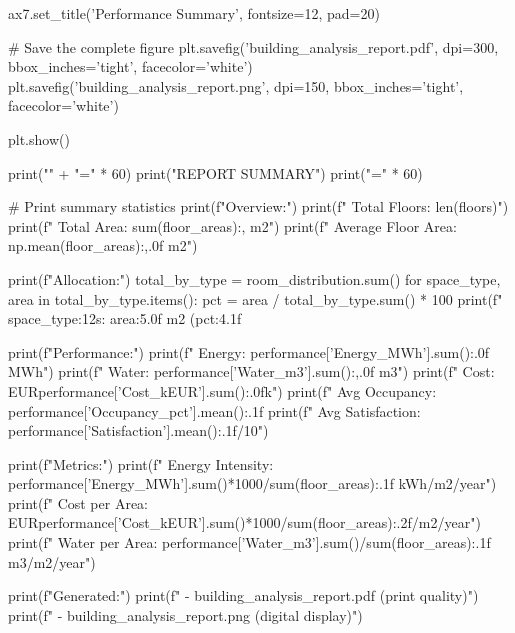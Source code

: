 {{    ax7.set_title('Performance Summary', fontsize=12, pad=20)
    
    # Save the complete figure
    plt.savefig('building_analysis_report.pdf', 
               dpi=300, bbox_inches='tight', facecolor='white')
    plt.savefig('building_analysis_report.png', 
               dpi=150, bbox_inches='tight', facecolor='white')
    
    plt.show()
    
    print("\n" + "=" * 60)
    print("REPORT SUMMARY")
    print("=" * 60)
    
    # Print summary statistics
    print(f"\nBuilding Overview:")
    print(f"  Total Floors: {len(floors)}")
    print(f"  Total Area: {sum(floor_areas):,} m2")
    print(f"  Average Floor Area: {np.mean(floor_areas):,.0f} m2")
    
    print(f"\nSpace Allocation:")
    total_by_type = room_distribution.sum()
    for space_type, area in total_by_type.items():
        pct = area / total_by_type.sum() * 100
        print(f"  {space_type:12s}: {area:5.0f} m2 ({pct:4.1f}%
    
    print(f"\nAnnual Performance:")
    print(f"  Energy: {performance['Energy_MWh'].sum():.0f} MWh")
    print(f"  Water: {performance['Water_m3'].sum():,.0f} m3")
    print(f"  Cost: EUR{performance['Cost_kEUR'].sum():.0f}k")
    print(f"  Avg Occupancy: {performance['Occupancy_pct'].mean():.1f}%
    print(f"  Avg Satisfaction: {performance['Satisfaction'].mean():.1f}/10")
    
    print(f"\nEfficiency Metrics:")
    print(f"  Energy Intensity: {performance['Energy_MWh'].sum()*1000/sum(floor_areas):.1f} kWh/m2/year")
    print(f"  Cost per Area: EUR{performance['Cost_kEUR'].sum()*1000/sum(floor_areas):.2f}/m2/year")
    print(f"  Water per Area: {performance['Water_m3'].sum()/sum(floor_areas):.1f} m3/m2/year")
    
    print(f"\nFiles Generated:")
    print(f"  - building_analysis_report.pdf (print quality)")
    print(f"  - building_analysis_report.png (digital display)")
    
}}
